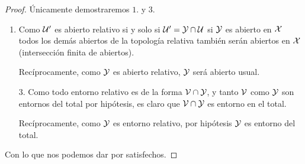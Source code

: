 \begin{proof}
	Únicamente demostraremos $1.$ y $3.$
	\begin{enumerate}
		\item Como $\mathcal{U}'$ es abierto relativo si y solo si $\mathcal{U}'=\mathcal{Y}\cap\mathcal{U}$ si $\mathcal{Y}$ es abierto en $\mathcal{X}$ todos los demás abiertos de la topología relativa también serán abiertos en $\mathcal{X}$ (intersección finita de abiertos).
		
		Recíprocamente, como $\mathcal{Y}$ es abierto relativo, $\mathcal{Y}$ será abierto usual.
		\item[$3.$] Como todo entorno relativo es de la forma $\mathcal{V}\cap\mathcal{Y}$, y tanto $\mathcal{V}$ como $\mathcal{Y}$ son entornos del total por hipótesis, es claro que $\mathcal{V}\cap\mathcal{Y}$ es entorno en el total.
		
		Recíprocamente, como $\mathcal{Y}$ es entorno relativo, por hipótesis $\mathcal{Y}$ es entorno del total.
	\end{enumerate}
	Con lo que nos podemos dar por satisfechos.
\end{proof}